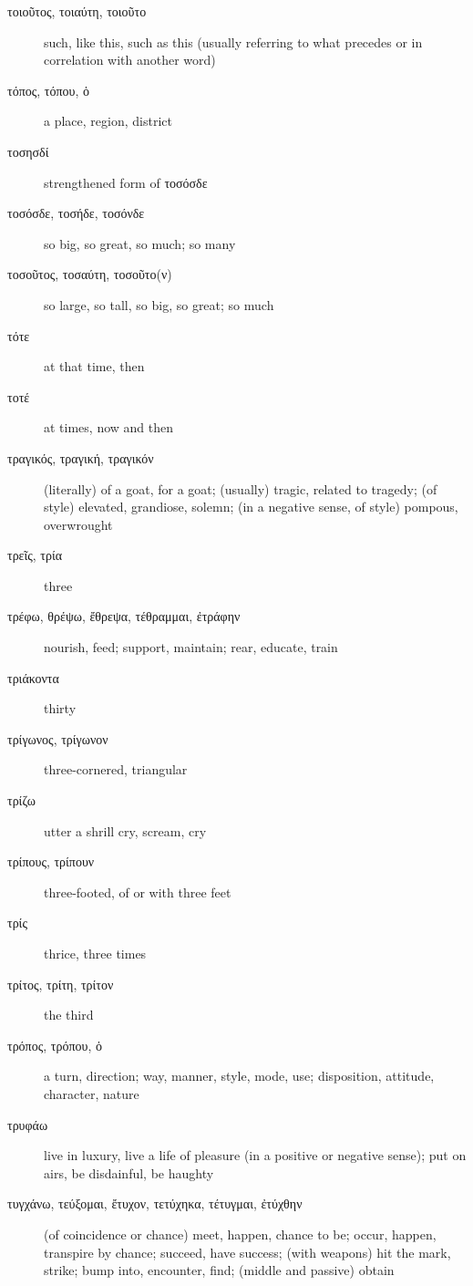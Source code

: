 \documentclass[12pt,letterpaper]{article}
\begin{document}
\begin{description}
    \item[\textgreek{τοιοῦτος, τοιαύτη, τοιοῦτο}] \marginnote{*}such, like this, such as this (usually referring to what precedes or in correlation with another word)
    \item[\textgreek{τόπος, τόπου, ὁ}] \marginnote{*}a place, region, district
    \item[\textgreek{τοσησδί}] strengthened form of τοσόσδε
    \item[\textgreek{τοσόσδε, τοσήδε, τοσόνδε}] so big, so great, so much; so many
    \item[\textgreek{τοσοῦτος, τοσαύτη, τοσοῦτο(ν)}] \marginnote{*}so large, so tall, so big, so great; so much
    \item[\textgreek{τότε}] \marginnote{*}at that time, then
    \item[\textgreek{τοτέ}] \marginnote{*}at times, now and then
    \item[\textgreek{τραγικός, τραγική, τραγικόν}] (literally) of a goat, for a goat; (usually) tragic, related to tragedy; (of style) elevated, grandiose, solemn; (in a negative sense, of style) pompous, overwrought
    \item[\textgreek{τρεῖς, τρία}] three
    \item[\textgreek{τρέφω, θρέψω, ἔθρεψα, τέθραμμαι, ἐτράφην}] \marginnote{*}nourish, feed; support, maintain; rear, educate, train
    \item[\textgreek{τριάκοντα}] \marginnote{*}thirty
    \item[\textgreek{τρίγωνος, τρίγωνον}] three-cornered, triangular
    \item[\textgreek{τρίζω}] utter a shrill cry, scream, cry
    \item[\textgreek{τρίπους, τρίπουν}] three-footed, of or with three feet
    \item[\textgreek{τρίς}] thrice, three times
    \item[\textgreek{τρίτος, τρίτη, τρίτον}] \marginnote{*}the third
    \item[\textgreek{τρόπος, τρόπου, ὁ}] \marginnote{*}a turn, direction; way, manner, style, mode, use; disposition, attitude, character, nature
    \item[\textgreek{τρυφάω}] live in luxury, live a life of pleasure (in a positive or negative sense); put on airs, be disdainful, be haughty
    \item[\textgreek{τυγχάνω, τεύξομαι, ἔτυχον, τετύχηκα, τέτυγμαι, ἐτύχθην}] \marginnote{*}(of coincidence or chance) meet, happen, chance to be; occur, happen, transpire by chance; succeed, have success; (with weapons) hit the mark, strike; bump into, encounter, find; (middle and passive) obtain

\end{description}
\end{document}

